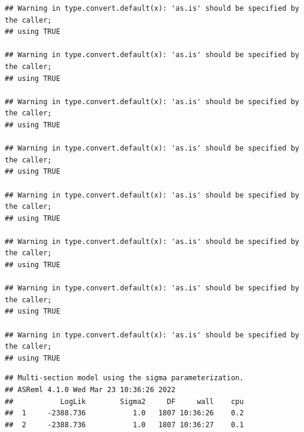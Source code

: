 \documentclass[
  12pt,
]{book}
\newenvironment{Shaded}{\begin{snugshade}}{\end{snugshade}}
\newcommand{\KeywordTok}[1]{\textcolor[rgb]{0.13,0.29,0.53}{\textbf{#1}}}
\newcommand{\NormalTok}[1]{#1}
\newcommand{\OperatorTok}[1]{\textcolor[rgb]{0.81,0.36,0.00}{\textbf{#1}}}
\begin{document}
\begin{verbatim}
## Warning in type.convert.default(x): 'as.is' should be specified by the caller;
## using TRUE

## Warning in type.convert.default(x): 'as.is' should be specified by the caller;
## using TRUE

## Warning in type.convert.default(x): 'as.is' should be specified by the caller;
## using TRUE

## Warning in type.convert.default(x): 'as.is' should be specified by the caller;
## using TRUE

## Warning in type.convert.default(x): 'as.is' should be specified by the caller;
## using TRUE

## Warning in type.convert.default(x): 'as.is' should be specified by the caller;
## using TRUE

## Warning in type.convert.default(x): 'as.is' should be specified by the caller;
## using TRUE

## Warning in type.convert.default(x): 'as.is' should be specified by the caller;
## using TRUE
\end{verbatim}

\begin{verbatim}
## Multi-section model using the sigma parameterization.
## ASReml 4.1.0 Wed Mar 23 10:36:26 2022
##           LogLik        Sigma2     DF     wall    cpu
##  1     -2388.736           1.0   1807 10:36:26    0.2
##  2     -2388.736           1.0   1807 10:36:27    0.1
\end{verbatim}

\begin{Shaded}
\end{Shaded}
\end{document}
